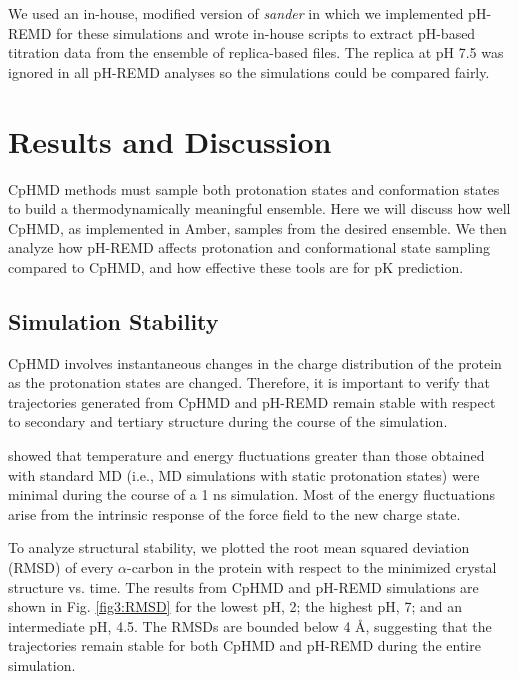 We used an in-house, modified version of \emph{sander} in which we implemented
pH-REMD for these simulations and wrote in-house scripts to extract pH-based
titration data from the ensemble of replica-based files. The replica at pH 7.5
was ignored in all pH-REMD analyses so the simulations could be compared fairly.

\section{Results and Discussion}

CpHMD methods must sample both protonation states and conformation states to
build a thermodynamically meaningful ensemble. Here we will discuss how well
CpHMD, as implemented in Amber, \cite{Mongan2004} samples from the desired
ensemble. We then analyze how pH-REMD affects protonation and conformational
state sampling compared to CpHMD, and how effective these tools are for
pK prediction.

\subsection{Simulation Stability}
CpHMD involves instantaneous changes in the charge distribution of the protein
as the protonation states are changed. Therefore, it is important to verify
that trajectories generated from CpHMD and pH-REMD remain stable with respect to
secondary and tertiary structure during the course of the simulation.

\citeauthor{Mongan2004} \cite{Mongan2004} showed that temperature and energy
fluctuations greater than those obtained with standard MD (i.e., MD simulations
with static protonation states) were minimal during the course of a 1 ns
simulation. Most of the energy fluctuations arise from the intrinsic response
of the force field to the new charge state.

To analyze structural stability, we plotted the root mean squared deviation
(RMSD) of every $\alpha$-carbon in the protein with respect to the minimized
crystal structure vs. time. The results from CpHMD and pH-REMD simulations are
shown in Fig. \ref{fig3:RMSD} for the lowest pH, 2; the highest pH, 7; and an
intermediate pH, 4.5. The RMSDs are bounded below 4 \AA, suggesting that the
trajectories remain stable for both CpHMD and pH-REMD during the entire
simulation.

